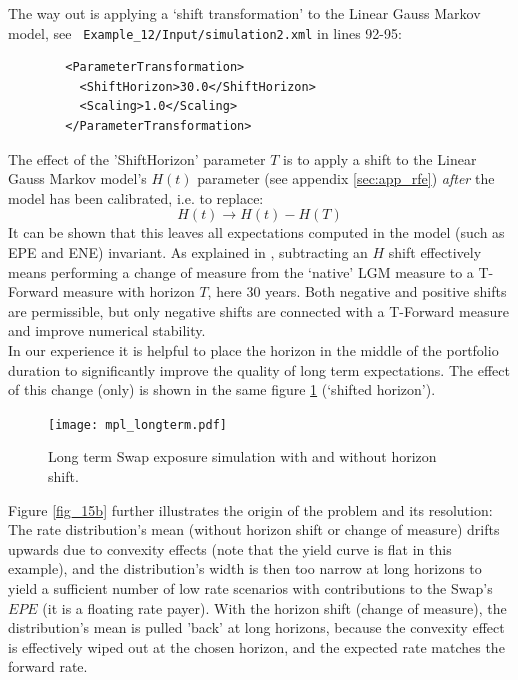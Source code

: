 \documentclass[12pt, a4paper]{article}
\newcommand{\EPE}{\mathit{EPE}}
\begin{document}
The way out is applying a `shift transformation' to the Linear Gauss Markov model, see {\tt
  Example\_12/Input/simulation2.xml} in lines 92-95:
\begin{listing}[H]
\begin{verbatim}
        <ParameterTransformation>
          <ShiftHorizon>30.0</ShiftHorizon>
          <Scaling>1.0</Scaling>
        </ParameterTransformation>
\end{verbatim}
\end{listing}

The effect of the 'ShiftHorizon' parameter $T$ is to apply a shift to the Linear Gauss Markov model's $H(t)$ parameter
(see appendix \ref{sec:app_rfe}) {\em after} the model has been calibrated, i.e. to replace:
$$ 
H(t) \rightarrow H(t) - H(T) 
$$ 
It can be shown that this leaves all expectations computed in the model (such as EPE and ENE) invariant. As explained in
\cite{Lichters}, subtracting an $H$ shift effectively means performing a change of measure from the `native' LGM measure
to a T-Forward measure with horizon $T$, here 30 years. Both negative and positive shifts are permissible, but only
negative shifts are connected with a T-Forward measure and improve numerical stability. \\

In our experience it is helpful to place the horizon in the middle of the portfolio duration to significantly improve
the quality of long term expectations. The effect of this change (only) is shown in the same figure \ref{fig_15}
(`shifted horizon').
\begin{figure}[h!]
\begin{center}
\texttt{[image: mpl\_longterm.pdf]}
\end{center}
\caption{Long term Swap exposure simulation with and without horizon shift.}
\label{fig_15}
\end{figure}
Figure \ref{fig_15b} further illustrates the origin of the problem and its resolution: The rate distribution's mean
(without horizon shift or change of measure) drifts upwards due to convexity effects (note that the yield curve is flat
in this example), and the distribution's width is then too narrow at long horizons to yield a sufficient number of low
rate scenarios with contributions to the Swap's $\EPE$ (it is a floating rate payer). With the horizon shift (change of
measure), the distribution's mean is pulled 'back' at long horizons, because the convexity effect is effectively wiped
out at the chosen horizon, and the expected rate matches the forward rate.
\end{document}
